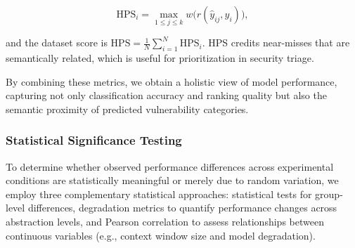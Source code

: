 \documentclass[lettersize,journal]{IEEEtran}
\begin{document}
\begin{itemize}
    \begin{equation}
      \mathrm{HPS}_i=\max_{1\le j\le k} w\big(r(\hat y_{ij},y_i)\big),
    \end{equation}
    
    and the dataset score is $\mathrm{HPS}=\tfrac{1}{N}\sum_{i=1}^N \mathrm{HPS}_i$. \gls{HPS}  credits near-misses that are semantically related, which is useful for prioritization in security triage.
    
\end{itemize}

By combining these metrics, we obtain a holistic view of model performance, capturing not only classification accuracy and ranking quality but also the semantic proximity of predicted vulnerability categories.


\subsubsection{Statistical Significance Testing}
To determine whether observed performance differences across experimental conditions are statistically meaningful or merely due to random variation, we employ three complementary statistical approaches: statistical tests for group-level differences, degradation metrics to quantify performance changes across abstraction levels, and Pearson correlation to assess relationships between continuous variables (e.g., context window size and model degradation).
\end{document}
